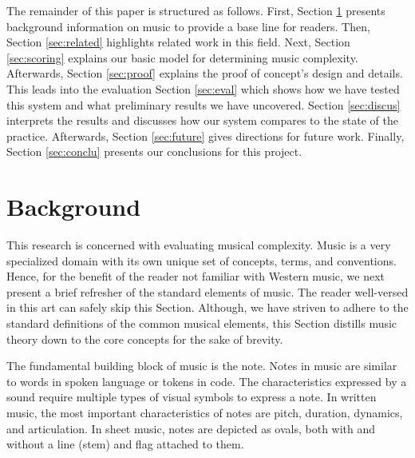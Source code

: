 \documentclass[10pt,preprint]{sigplanconf}
\begin{document}
The remainder of this paper is structured as follows. First, Section \ref{sec:background} presents background information on music to provide a base line for readers. Then, Section \ref{sec:related} highlights related work in this field. Next, Section \ref{sec:scoring} explains our basic model for determining music complexity.  Afterwards, Section \ref{sec:proof} explains the proof of concept's design and details. This leads into the evaluation Section \ref{sec:eval} which shows how we have tested this system and what preliminary results we have uncovered. Section \ref{sec:discus} interprets the results and discusses how our system compares to the state of the practice. Afterwards, Section \ref{sec:future} gives directions for future work. Finally, Section \ref{sec:conclu} presents our conclusions for this project.

\section{Background} 
\label{sec:background}

This research is concerned with evaluating musical complexity. Music is a very specialized domain with its own unique set of concepts, terms, and conventions. Hence, for the benefit of the reader not familiar with Western music, we next present a brief refresher of the standard elements of music. The reader well-versed in this art can safely skip this Section. Although, we have striven to adhere to the standard definitions of the common musical elements, this Section distills music theory down to the core concepts for the sake of brevity.



The fundamental building block of music is the note. Notes in music are similar to words in spoken language or tokens in code. The characteristics expressed by a sound require multiple types of visual symbols to express a note. In written music, the most important characteristics of notes are pitch, duration, dynamics, and articulation. In sheet music, notes are depicted as ovals, both with and without a line (stem) and flag attached to them.
\end{document}
